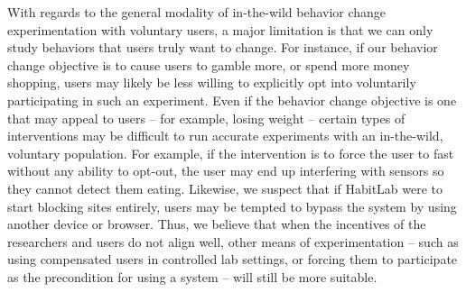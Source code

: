 With regards to the general modality of in-the-wild behavior change experimentation with voluntary users, a major limitation is that we can only study behaviors that users truly want to change. For instance, if our behavior change objective is to cause users to gamble more, or spend more money shopping, users may likely be less willing to explicitly opt into voluntarily participating in such an experiment. Even if the behavior change objective is one that may appeal to users -- for example, losing weight -- certain types of interventions may be difficult to run accurate experiments with an in-the-wild, voluntary population. For example, if the intervention is to force the user to fast without any ability to opt-out, the user may end up interfering with sensors so they cannot detect them eating. Likewise, we suspect that if HabitLab were to start blocking sites entirely, users may be tempted to bypass the system by using another device or browser. Thus, we believe that when the incentives of the researchers and users do not align well, other means of experimentation -- such as using compensated users in controlled lab settings, or forcing them to participate as the precondition for using a system -- will still be more suitable.
